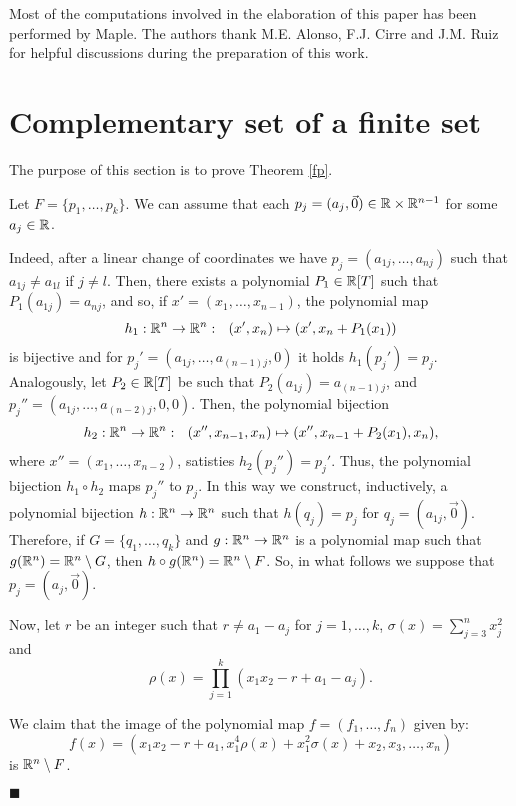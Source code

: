 \documentclass[11pt,draft]{article}
\newenvironment{prooffp}%
	{\par\noindent{\it Proof of Theorem
\ref{fp}.}\nopagebreak\normalsize}%
	{\hfill\linebreak[2]\hspace*{\fill}$\blacksquare$\\[5pt]}
\begin{document}
Most of the computations involved in the elaboration of this paper has been performed by
Maple. The authors thank M.E. Alonso, F.J. Cirre and J.M. Ruiz for helpful
discussions during the preparation of this work. 

\section{Complementary set of a finite set}
The purpose of this section is to prove Theorem \ref{fp}.
\begin{prooffp}
Let $F=\{p_1,\ldots,p_k\}$. We can assume that each $p_j=(a_j,\vec{0})\in{\mathbb R}\times{\mathbb R}^{n-1}$ 
for some $a_j\in{\mathbb R}$.

Indeed, after a linear change of coordinates we have 
$p_j=(a_{1j},\ldots,a_{nj})$ such that $a_{1j}\neq a_{1l}$ if $j\neq l$. Then,
there exists a polynomial $P_1\in{\mathbb R}[T]$ such that $P_1(a_{1j})=a_{nj}$, and so, if
$x'=(x_1,\ldots,x_{n-1})$, the polynomial map 
$$
h_1:{\mathbb R}^n\rightarrow{\mathbb R}^n:\ \ (x',x_n)\mapsto (x',x_n+P_1(x_1))
$$
is bijective and for $p_j'=(a_{1j},\ldots,a_{(n-1)j},0)$ it holds $h_1(p_j')=p_j$. 
Analogously, let $P_2\in{\mathbb R}[T]$ be such that $P_2(a_{1j})=a_{(n-1)j}$, and
$p_j''=(a_{1j},\ldots,a_{(n-2)j},0,0)$. Then, the polynomial bijection
$$
h_2:\R^n\rightarrow\R^n:\ \ (x'',x_{n-1},x_n)\mapsto (x'',x_{n-1}+P_2(x_1),x_n),
$$
where $x''=(x_1,\ldots,x_{n-2})$, satisties $h_2(p_j'')=p_j'$. Thus, the polynomial
bijection $h_1\circ h_2$ maps $p_j''$ to $p_j$. In this way we construct,
inductively, a polynomial bijection $h:{\mathbb R}^n\rightarrow{\mathbb R}^n$ such that $h(q_j)=p_j$ for
$q_j=(a_{1j},\vec{0})$.  Therefore, if $G=\{q_1,\ldots,q_k\}$ and $g:{\mathbb R}^n\rightarrow{\mathbb R}^n$ is
a polynomial map such that $g({\mathbb R}^n)={\mathbb R}^n\setminus G$, then $h\circ g({\mathbb R}^n)={\mathbb R}^n\setminus F$.
So, in what follows we suppose that $p_j=(a_j,\vec{0})$.

Now, let $r$ be an integer such that $r\neq a_1-a_j$ for $j=1,\ldots,k$,
$\sigma(x)=\sum_{j=3}^n x_j^2$ and 
$$
\rho(x)=\prod_{j=1}^k(x_1x_2-r+a_1-a_j).$$

We claim that the image of the polynomial map $f=(f_1,\ldots,f_n)$ given by:
$$
f(x)=\left(x_1x_2-r+a_1,x_1^{4}\rho(x)+x_1^{2}\sigma(x)+x_2,x_3,\ldots,x_n\right)
$$
is ${\mathbb R}^n\setminus F$.


\end{prooffp}
\end{document}
